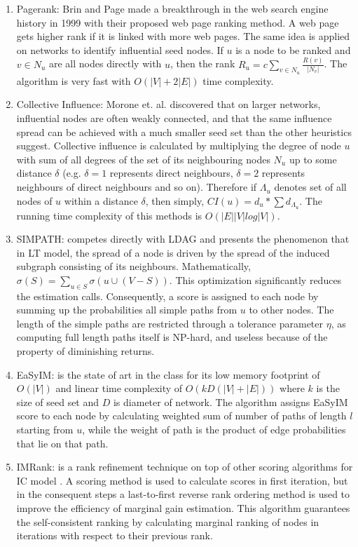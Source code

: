		\begin{enumerate}
			\item Pagerank: Brin and Page made a breakthrough in the web search engine history in 1999 \cite{pagerank1999} with their proposed web page ranking method. A web page gets higher rank if it is linked with more web pages. The same idea is applied on networks to identify influential seed nodes. If $u$ is a node to be ranked and $v\in N_u$ are all nodes directly with $u$, then the rank $R_u=c\sum_{v\in N_u}\frac{R(v)}{|N_v|}$. The algorithm is very fast with $O(|V|+2|E|)$ time complexity.
			
			\item Collective Influence: Morone et. al. \cite{morone2015} discovered that on larger networks, influential nodes are often weakly connected, and that the same influence spread can be achieved with a much smaller seed set than the other heuristics suggest. Collective influence is calculated by multiplying the degree of node $u$ with sum of all degrees of the set of its neighbouring nodes $N_u$ up to some distance $\delta$ (e.g. $\delta=1$ represents direct neighbours, $\delta=2$ represents neighbours of direct neighbours and so on). Therefore if $\Lambda_u$ denotes set of all nodes of $u$ within a distance $\delta$, then simply, $CI(u)=d_u * \sum d_{\Lambda_u}$. The running time complexity of this methods is $O(|E||V|log|V|)$.
			
			\item SIMPATH: competes directly with LDAG \cite{chen2010b} and presents the phenomenon that in LT model, the spread of a node is driven by the spread of the induced subgraph consisting of its neighbours. Mathematically, $\sigma(S)=\sum_{u\in S}\sigma(u\cup (V-S))$. This optimization significantly reduces the estimation calls. Consequently, a score is assigned to each node by summing up the probabilities all simple paths from $u$ to other nodes. The length of the simple paths are restricted through a tolerance parameter $\eta$, as computing full length paths itself is NP-hard, and useless because of the property of diminishing returns.
			
			\item EaSyIM: \cite{galhotra2016} is the state of art in the class for its low memory footprint of $O(|V|)$ and linear time complexity of $O(kD(|V|+|E|))$ where $k$ is the size of seed set and $D$ is diameter of network. The algorithm assigns EaSyIM score to each node by calculating weighted sum of number of paths of length $l$ starting from $u$, while the weight of path is the product of edge probabilities that lie on that path.
			
			\item IMRank: is a rank refinement technique on top of other scoring algorithms for IC model \cite{cheng2014b}. A scoring method is used to calculate scores in first iteration, but in the consequent steps a last-to-first reverse rank ordering method is used to improve the efficiency of marginal gain estimation. This algorithm guarantees the self-consistent ranking by calculating marginal ranking of nodes in iterations with respect to their previous rank.
			
		\end{enumerate}


